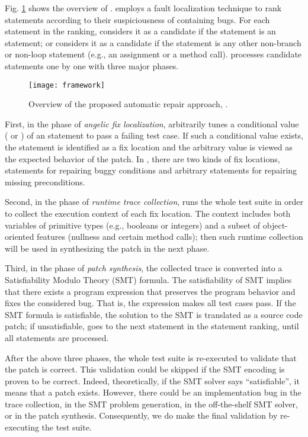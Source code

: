 Fig. \ref{fig:framework} shows the overview of \nopol.  
 \nopol employs a fault localization technique to rank statements according to their suspiciousness of containing bugs. For each statement in the ranking, \nopol considers it as a \buggycondition candidate if the statement is an \ourif statement; or \nopol considers it as a \precondition candidate if the statement is any other non-branch or non-loop statement (e.g., an assignment or a method call). \nopol processes candidate statements one by one with three major phases. 

\begin{figure}[!t]
\centering
\texttt{[image: framework]}
\caption{Overview of the proposed automatic repair approach, \nopol.}
\label{fig:framework}
\end{figure}

First, in the phase of \emph{angelic fix localization}, \nopol arbitrarily tunes a conditional value ( or ) of an \ourif statement to pass a failing test case. If such a conditional value exists, the statement is identified as a fix location and the arbitrary value is viewed as the expected behavior of the patch. In \nopol, there are two kinds of fix locations, \ourif statements for repairing buggy conditions and arbitrary statements for repairing missing preconditions.

Second, in the phase of \emph{runtime trace collection}, \nopol runs the whole test suite in order to collect the execution context of each fix location. The context includes both variables of primitive types (e.g., booleans or integers) and a subset of object-oriented features (nullness and certain method calls); then such runtime collection will be used in synthesizing the patch in the next phase. 

Third, in the phase of \emph{patch synthesis}, the collected trace is converted into a Satisfiability Modulo Theory (SMT) formula. The satisfiability of SMT implies that there exists a program expression that preserves the program behavior and fixes the considered bug. That is, the expression makes all test cases pass. If the SMT formula is satisfiable, the solution to the SMT is translated as a source code patch; if unsatisfiable, \nopol goes to the next statement in the statement ranking, until all statements are processed. 

After the above three phases, the whole test suite is re-executed to validate that the patch is correct. This validation could be skipped if the SMT encoding is proven to be correct.
Indeed, theoretically, if the SMT solver says ``satisfiable'', it means that a patch exists. 
However, there could be an implementation bug in the trace collection, in the SMT problem generation, in the off-the-shelf SMT solver, or in the patch synthesis.  
Consequently, we do make the final validation by re-executing the test suite.

